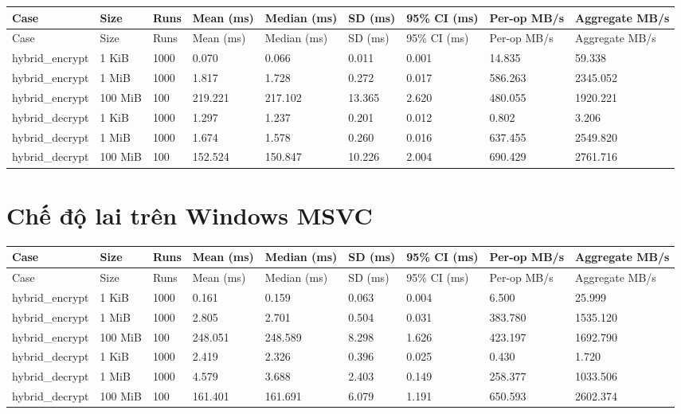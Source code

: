 \documentclass[12pt,a4paper,oneside]{report}
\begin{document}
\begin{longtable}{p{}p{}p{}p{}p{}p{}p{}p{}p{}}
\toprule
Case & Size & Runs & Mean (ms) & Median (ms) & SD (ms) & 95\% CI (ms) & Per-op MB/s & Aggregate MB/s \\
\midrule
\endfirsthead
\toprule
Case & Size & Runs & Mean (ms) & Median (ms) & SD (ms) & 95\% CI (ms) & Per-op MB/s & Aggregate MB/s \\
\midrule
\endhead
hybrid\_encrypt & 1 KiB & 1000 & 0.070 & 0.066 & 0.011 & 0.001 & 14.835 & 59.338 \\
hybrid\_encrypt & 1 MiB & 1000 & 1.817 & 1.728 & 0.272 & 0.017 & 586.263 & 2345.052 \\
hybrid\_encrypt & 100 MiB & 100 & 219.221 & 217.102 & 13.365 & 2.620 & 480.055 & 1920.221 \\
hybrid\_decrypt & 1 KiB & 1000 & 1.297 & 1.237 & 0.201 & 0.012 & 0.802 & 3.206 \\
hybrid\_decrypt & 1 MiB & 1000 & 1.674 & 1.578 & 0.260 & 0.016 & 637.455 & 2549.820 \\
hybrid\_decrypt & 100 MiB & 100 & 152.524 & 150.847 & 10.226 & 2.004 & 690.429 & 2761.716 \\
\bottomrule
\end{longtable}


\section{Chế độ lai trên Windows MSVC}


\begin{longtable}{p{}p{}p{}p{}p{}p{}p{}p{}p{}}
\toprule
Case & Size & Runs & Mean (ms) & Median (ms) & SD (ms) & 95\% CI (ms) & Per-op MB/s & Aggregate MB/s \\
\midrule
\endfirsthead
\toprule
Case & Size & Runs & Mean (ms) & Median (ms) & SD (ms) & 95\% CI (ms) & Per-op MB/s & Aggregate MB/s \\
\midrule
\endhead
hybrid\_encrypt & 1 KiB & 1000 & 0.161 & 0.159 & 0.063 & 0.004 & 6.500 & 25.999 \\
hybrid\_encrypt & 1 MiB & 1000 & 2.805 & 2.701 & 0.504 & 0.031 & 383.780 & 1535.120 \\
hybrid\_encrypt & 100 MiB & 100 & 248.051 & 248.589 & 8.298 & 1.626 & 423.197 & 1692.790 \\
hybrid\_decrypt & 1 KiB & 1000 & 2.419 & 2.326 & 0.396 & 0.025 & 0.430 & 1.720 \\
hybrid\_decrypt & 1 MiB & 1000 & 4.579 & 3.688 & 2.403 & 0.149 & 258.377 & 1033.506 \\
hybrid\_decrypt & 100 MiB & 100 & 161.401 & 161.691 & 6.079 & 1.191 & 650.593 & 2602.374 \\
\bottomrule
\end{longtable}
\end{document}
